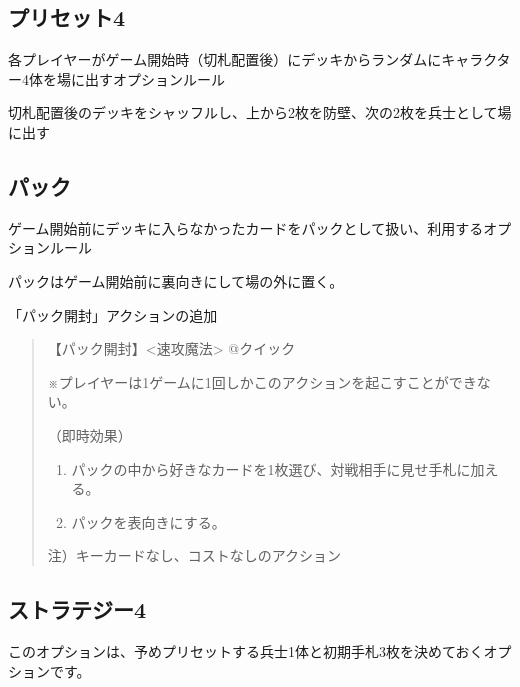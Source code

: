 \documentclass[letterpaper,10pt,dvipdfmx]{sphinxmanual}
\begin{document}
\subsection{プリセット4}
\label{\detokenize{match-regulations/match-regulations:id10}}
\sphinxAtStartPar
各プレイヤーがゲーム開始時（切札配置後）にデッキからランダムにキャラクター4体を場に出すオプションルール

\sphinxAtStartPar
切札配置後のデッキをシャッフルし、上から2枚を防壁、次の2枚を兵士として場に出す


\subsection{パック}
\label{\detokenize{match-regulations/match-regulations:id11}}
\sphinxAtStartPar
ゲーム開始前にデッキに入らなかったカードをパックとして扱い、利用するオプションルール

\sphinxAtStartPar
パックはゲーム開始前に裏向きにして場の外に置く。

\sphinxAtStartPar
「パック開封」アクションの追加
\begin{quote}

\sphinxAtStartPar
【パック開封】\textless{}速攻魔法\textgreater{} @クイック

\sphinxAtStartPar
※プレイヤーは1ゲームに1回しかこのアクションを起こすことができない。

\sphinxAtStartPar
（即時効果）
\begin{enumerate}
%
\item {} 
\sphinxAtStartPar
パックの中から好きなカードを1枚選び、対戦相手に見せ手札に加える。

\item {} 
\sphinxAtStartPar
パックを表向きにする。

\end{enumerate}

\sphinxAtStartPar
注）キーカードなし、コストなしのアクション
\end{quote}


\subsection{ストラテジー4}
\label{\detokenize{match-regulations/match-regulations:id12}}
\sphinxAtStartPar
このオプションは、予めプリセットする兵士1体と初期手札3枚を決めておくオプションです。
\end{document}
